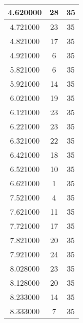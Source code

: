 \begin{longtable}[htbp]{|c|c|c|}
4.620000 & 28 & 35 \\ \hline
4.721000 & 23 & 35 \\ \hline
4.821000 & 17 & 35 \\ \hline
4.921000 & 6 & 35 \\ \hline
5.821000 & 6 & 35 \\ \hline
5.921000 & 14 & 35 \\ \hline
6.021000 & 19 & 35 \\ \hline
6.121000 & 23 & 35 \\ \hline
6.221000 & 23 & 35 \\ \hline
6.321000 & 22 & 35 \\ \hline
6.421000 & 18 & 35 \\ \hline
6.521000 & 10 & 35 \\ \hline
6.621000 & 1 & 35 \\ \hline
7.521000 & 4 & 35 \\ \hline
7.621000 & 11 & 35 \\ \hline
7.721000 & 17 & 35 \\ \hline
7.821000 & 20 & 35 \\ \hline
7.921000 & 24 & 35 \\ \hline
8.028000 & 23 & 35 \\ \hline
8.128000 & 20 & 35 \\ \hline
8.233000 & 14 & 35 \\ \hline
8.333000 & 7 & 35 \\ \hline
\end{longtable}
